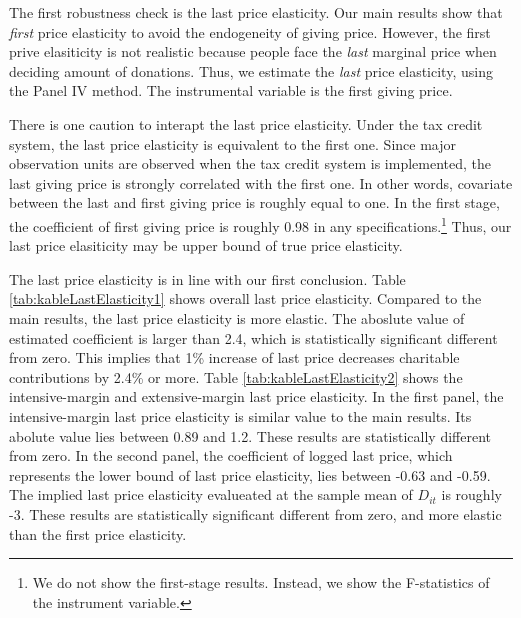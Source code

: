 \documentclass[ review  , 3p ]{elsarticle}
\begin{document}
  The first robustness check is the last price elasticity.
  Our main results show that \emph{first} price elasticity to avoid the endogeneity of giving price.
  However, the first prive elasiticity is not realistic
  because people face the \emph{last} marginal price when deciding amount of donations.
  Thus, we estimate the \emph{last} price elasticity, using the Panel IV method.
  The instrumental variable is the first giving price.

  \color{blue}

  There is one caution to interapt the last price elasticity.
  Under the tax credit system, the last price elasticity is equivalent to the first one.
  Since major observation units are observed when the tax credit system is implemented,
  the last giving price is strongly correlated with the first one.
  In other words, covariate between the last and first giving price is roughly equal to one.
  In the first stage, the coefficient of first giving price is roughly 0.98 in any specifications.\footnote{We do not show the first-stage results. Instead, we show the F-statistics of the instrument variable.}
  Thus, our last price elasiticity may be upper bound of true price elasticity.

  \color{black}

  The last price elasticity is in line with our first conclusion.
  Table \ref{tab:kableLastElasticity1} shows overall last price elasticity.
  Compared to the main results, the last price elasticity is more elastic.
  The aboslute value of estimated coefficient is larger than 2.4,
  which is statistically significant different from zero.
  This implies that 1\% increase of last price decreases charitable contributions by 2.4\% or more.
  Table \ref{tab:kableLastElasticity2} shows the intensive-margin and extensive-margin last price elasticity.
  In the first panel,
  the intensive-margin last price elasticity is similar value to the main results.
  Its abolute value lies between 0.89 and 1.2.
  These results are statistically different from zero.
  In the second panel,
  the coefficient of logged last price, which represents the lower bound of last price elasticity,
  lies between -0.63 and -0.59.
  The implied last price elasticity evalueated at the sample mean of \(D_{it}\) is roughly -3.
  These results are statistically significant different from zero,
  and more elastic than the first price elasticity.
\end{document}
